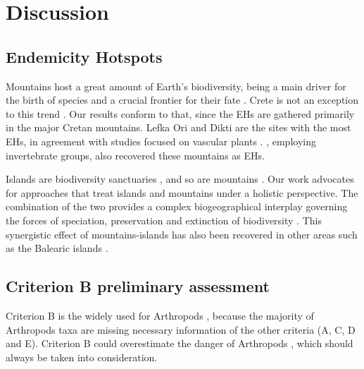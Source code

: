 \section{Discussion}
\label{sec:arthropods-discussion}

    \subsection{Endemicity Hotspots}
    \label{subsec:arthropods-Endemicity-Hotspots}

Mountains host a great amount of Earth’s biodiversity, being a main driver for
the birth of species \parencite{antonelli2018geological,noroozi2018hotspots,rahbek2019building,Rahbek2019}
and a crucial frontier for their fate \parencite{steinbauer2018accelerated,urban2018escalator}.
Crete is not an exception to this trend \parencite{kougioumoutzis2020plant,trigas2013elevational}.
Our results conform to that, since the EHs are gathered primarily in the major
Cretan mountains. Lefka Ori and Dikti are the sites with the most
EHs, in agreement with studies focused on vascular plants \parencite{dimitrakopoulos2004questioning,kougioumoutzis2020plant}.
\textcite{sfenthourakis2001hotspots}, employing invertebrate groups, also recovered these mountains as EHs.

Islands are biodiversity sanctuaries \parencite{whittaker2007island}, and
so are mountains \parencite{rahbek2019humboldts}. Our work advocates for approaches that
treat islands and mountains under a holistic perspective. The combination of
the two provides a complex biogeographical interplay governing the forces of
speciation, preservation and extinction of biodiversity \parencite{steinbauer2016topography-driven}.
This synergistic effect of mountains-islands has also been recovered in other
areas such as the Balearic islands \parencite{guardiola2023are-mediterranean}.

    \subsection{Criterion B preliminary assessment}
    \label{subsec:arthropods-species-assessment-disc}

Criterion B is the widely used for Arthropods \parencite{cardoso2011adapting,carpaneto2015a-red-list},
because the majority of Arthropods taxa are missing necessary information of the other criteria (A, C, D and E).
Criterion B could overestimate the danger of Arthropods \parencite{cardoso2011adapting},
which should always be taken into consideration.

